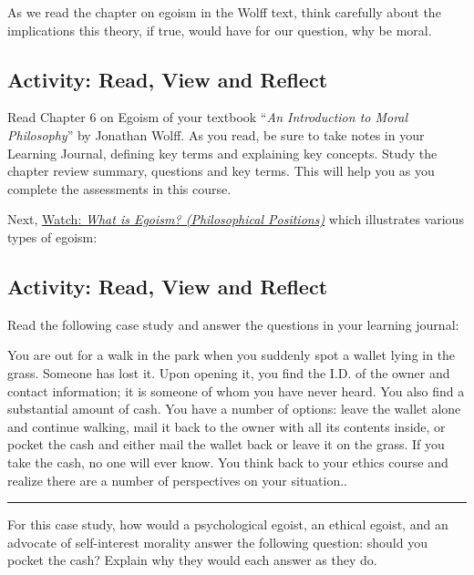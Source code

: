 \documentclass[
]{book}
\begin{document}
As we read the chapter on egoism in the Wolff text, think carefully about the implications this theory, if true, would have for our question, why be moral.

\hypertarget{activity-read-view-and-reflect-1}{%
\subsection*{Activity: Read, View and Reflect}\label{activity-read-view-and-reflect-1}}

\begin{reflect}
Read Chapter 6 on Egoism of your textbook ``\emph{An Introduction to Moral Philosophy}'' by Jonathan Wolff. As you read, be sure to take notes in your Learning Journal, defining key terms and explaining key concepts. Study the chapter review summary, questions and key terms. This will help you as you complete the assessments in this course.

Next, \href{https://www.youtube.com/watch?v=jpHggd-3_rM}{Watch: \emph{What is Egoism? (Philosophical Positions)}} which illustrates various types of egoism:
\end{reflect}

\hypertarget{activity-read-view-and-reflect-2}{%
\subsection*{Activity: Read, View and Reflect}\label{activity-read-view-and-reflect-2}}

\begin{reflect}
Read the following case study and answer the questions in your learning journal:

You are out for a walk in the park when you suddenly spot a wallet lying in the grass. Someone has lost it. Upon opening it, you find the I.D. of the owner and contact information; it is someone of whom you have never heard. You also find a substantial amount of cash. You have a number of options: leave the wallet alone and continue walking, mail it back to the owner with all its contents inside, or pocket the cash and either mail the wallet back or leave it on the grass. If you take the cash, no one will ever know. You think back to your ethics course and realize there are a number of perspectives on your situation..

\begin{center}\rule{0.5\linewidth}{0.5pt}\end{center}

For this case study, how would a psychological egoist, an ethical egoist, and an advocate of self-interest morality answer the following question: should you pocket the cash? Explain why they would each answer as they do.
\end{reflect}
\end{document}
